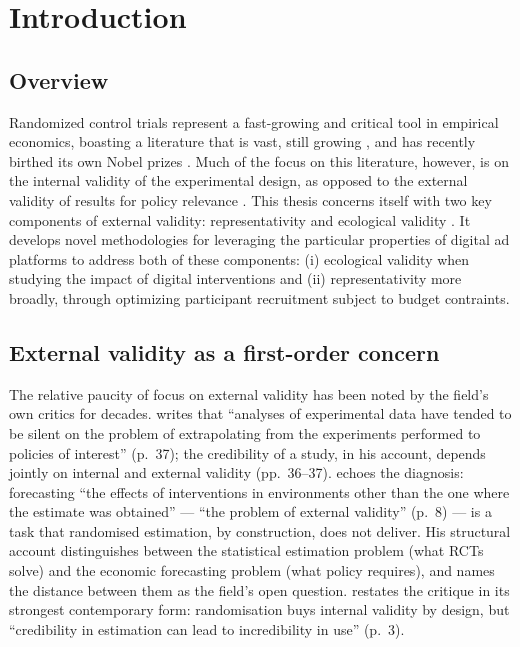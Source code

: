 \chapter{Introduction}
\label{ch:introduction}



\section{Overview}
\label{sec:intro:overview}


Randomized control trials represent a fast-growing and critical tool in empirical economics, boasting a literature that is vast, still growing \citep{Imbens2023}, and has recently birthed its own 
Nobel prizes \citep{Banerjee2020,Duflo2020,Kremer2020}. Much of the focus on this literature, however, is on the internal validity of the experimental design, as opposed to the external validity of results for policy relevance \citep{Heckman2008,Deaton2018,Manski2013}. This thesis concerns itself with two key components of external validity: representativity and ecological validity \citep{Neyman1934,Schmuckler2001}. It develops novel methodologies for leveraging the particular properties of digital ad platforms to address both of these components: (i) ecological validity when studying the impact of digital interventions and (ii) representativity more broadly, through optimizing participant recruitment subject to budget contraints. 

\section{External validity as a first-order concern}
\label{sec:intro:ev}

The relative paucity of focus on external validity has been noted by the field's own critics for decades. \citet{Manski2013} writes that ``analyses of experimental data have tended to be silent on the problem of extrapolating from the experiments performed to policies of interest'' (p.~37); the credibility of a study, in his account, depends jointly on internal and external validity (pp.~36--37). \citet{Heckman2008} echoes the diagnosis: forecasting ``the effects of interventions in environments other than the one where the estimate was obtained'' --- ``the problem of external validity'' (p.~8) --- is a task that randomised estimation, by construction, does not deliver. His structural account distinguishes between the statistical estimation problem (what RCTs solve) and the economic forecasting problem (what policy requires), and names the distance between them as the field's open question. \citet{Deaton2018} restates the critique in its strongest contemporary form: randomisation buys internal validity by design, but ``credibility in estimation can lead to incredibility in use'' (p.~3).

